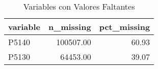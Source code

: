 \begin{table}[ht]
\centering
\begin{tabular}{lrr}
  \toprule
variable & n\_missing & pct\_missing \\ 
  \midrule
P5140 & 100507.00 & 60.93 \\ 
  P5130 & 64453.00 & 39.07 \\ 
   \bottomrule
\end{tabular}
\caption{Variables con Valores Faltantes} 
\label{tab:missing_values}
\end{table}
